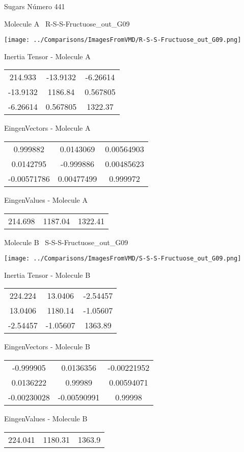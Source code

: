 \vtab[-3cm]
\begin{center}
{\large Sugars \tab Número 441}
\end{center}
\begin{multicols}{2}
\begin{center}

Molecule A \
R-S-S-Fructuose\_out\_G09

\texttt{[image: ../Comparisons/ImagesFromVMD/R-S-S-Fructuose\_out\_G09.png]}

Inertia Tensor - Molecule A \\
\begin{tabular}{|c c c|}
214.933	 & 	-13.9132	 & 	-6.26614	 \\
-13.9132	 & 	1186.84	 & 	0.567805	 \\
-6.26614	 & 	0.567805	 & 	1322.37
\end{tabular}

\vtab
 EingenVectors - Molecule A     \\
\begin{tabular}{|c c c|}
0.999882	 & 	0.0143069	 & 	0.00564903	 \\
0.0142795	 & 	-0.999886	 & 	0.00485623	 \\
-0.00571786	 & 	0.00477499	 & 	0.999972
\end{tabular}

\vtab
 EingenValues - Molecule A     \\
\begin{tabular}{|c c c|}
214.698	 & 	1187.04	 & 	1322.41	 \\
\end{tabular}
\columnbreak

Molecule B \
S-S-S-Fructuose\_out\_G09

\texttt{[image: ../Comparisons/ImagesFromVMD/S-S-S-Fructuose\_out\_G09.png]}

Inertia Tensor - Molecule B \\
\begin{tabular}{|c c c|}
224.224	 & 	13.0406	 & 	-2.54457	 \\
13.0406	 & 	1180.14	 & 	-1.05607	 \\
-2.54457	 & 	-1.05607	 & 	1363.89
\end{tabular}

\vtab
 EingenVectors - Molecule B     \\
\begin{tabular}{|c c c|}
-0.999905	 & 	0.0136356	 & 	-0.00221952	 \\
0.0136222	 & 	0.99989	 & 	0.00594071	 \\
-0.00230028	 & 	-0.00590991	 & 	0.99998
\end{tabular}

\vtab
 EingenValues - Molecule B     \\
\begin{tabular}{|c c c|}
224.041	 & 	1180.31	 & 	1363.9	 \\
\end{tabular}

\end{center}
\end{multicols}


